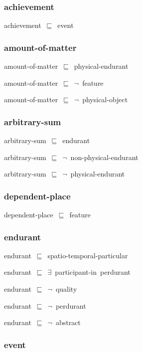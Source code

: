 \documentclass{article}
\begin{document}
\subsubsection*{achievement}

achievement~\ensuremath{\sqsubseteq}~event~

\subsubsection*{amount-of-matter}

amount-of-matter~\ensuremath{\sqsubseteq}~physical-endurant~

amount-of-matter~\ensuremath{\sqsubseteq}~\ensuremath{\lnot}~feature

amount-of-matter~\ensuremath{\sqsubseteq}~\ensuremath{\lnot}~physical-object

\subsubsection*{arbitrary-sum}

arbitrary-sum~\ensuremath{\sqsubseteq}~endurant~

arbitrary-sum~\ensuremath{\sqsubseteq}~\ensuremath{\lnot}~non-physical-endurant

arbitrary-sum~\ensuremath{\sqsubseteq}~\ensuremath{\lnot}~physical-endurant

\subsubsection*{dependent-place}

dependent-place~\ensuremath{\sqsubseteq}~feature~

\subsubsection*{endurant}

endurant~\ensuremath{\sqsubseteq}~spatio-temporal-particular~

endurant~\ensuremath{\sqsubseteq}~\ensuremath{\exists}~participant-in~perdurant~

endurant~\ensuremath{\sqsubseteq}~\ensuremath{\lnot}~quality

endurant~\ensuremath{\sqsubseteq}~\ensuremath{\lnot}~perdurant

endurant~\ensuremath{\sqsubseteq}~\ensuremath{\lnot}~abstract

\subsubsection*{event}
\end{document}

